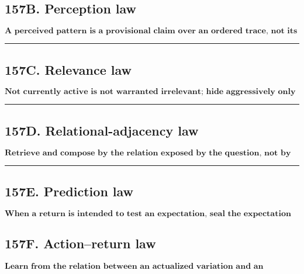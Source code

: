\documentclass[
]{article}
\begin{document}
\subsection{157B. Perception law}\label{perception-law}

\[
\boxed{
\textbf{A perceived pattern is a provisional claim over an ordered trace,
not its own warrant.}
}
\]

\begin{center}\rule{0.5\linewidth}{0.5pt}\end{center}

\subsection{157C. Relevance law}\label{relevance-law}

\[
\boxed{
\textbf{Not currently active is not warranted irrelevant; hide aggressively
only what protected consequence has made safely reopenable.}
}
\]

\begin{center}\rule{0.5\linewidth}{0.5pt}\end{center}

\subsection{157D. Relational-adjacency law}\label{relational-adjacency-law}

\[
\boxed{
\textbf{Retrieve and compose by the relation exposed by the question, not by
surface semantic proximity alone.}
}
\]

\begin{center}\rule{0.5\linewidth}{0.5pt}\end{center}


\subsection{157E. Prediction law}\label{prediction-law}

\[
\boxed{
\textbf{When a return is intended to test an expectation, seal the expectation
before the return is known.}
}
\]

\subsection{157F. Action--return law}\label{action-return-law}

\[
\boxed{
\textbf{Learn from the relation between an actualized variation and an
independently constrained return, not from the planned action alone.}
}
\]
\end{document}
